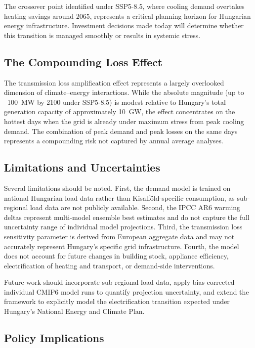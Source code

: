 \documentclass[11pt,a4paper]{article}
\begin{document}
The crossover point identified under SSP5-8.5, where cooling demand
overtakes heating savings around 2065, represents a critical planning
horizon for Hungarian energy infrastructure. Investment decisions made
today will determine whether this transition is managed smoothly or
results in systemic stress.

\subsection{The Compounding Loss Effect}
\label{sec:disc_losses}

The transmission loss amplification effect represents a largely
overlooked dimension of climate--energy interactions. While the
absolute magnitude (up to ~100~MW by 2100 under SSP5-8.5) is modest
relative to Hungary's total generation capacity of approximately 10~GW,
the effect concentrates on the hottest days when the grid is already
under maximum stress from peak cooling demand. The combination of peak
demand and peak losses on the same days represents a compounding risk
not captured by annual average analyses.

\subsection{Limitations and Uncertainties}
\label{sec:disc_limitations}

Several limitations should be noted. First, the demand model is trained
on national Hungarian load data rather than Kisalf\"{o}ld-specific
consumption, as sub-regional load data are not publicly available.
Second, the IPCC AR6 warming deltas represent multi-model ensemble best
estimates and do not capture the full uncertainty range of individual
model projections. Third, the transmission loss sensitivity parameter
is derived from European aggregate data and may not accurately represent
Hungary's specific grid infrastructure. Fourth, the model does not
account for future changes in building stock, appliance efficiency,
electrification of heating and transport, or demand-side interventions.

Future work should incorporate sub-regional load data, apply
bias-corrected individual CMIP6 model runs to quantify projection
uncertainty, and extend the framework to explicitly model the
electrification transition expected under Hungary's National Energy
and Climate Plan.

\subsection{Policy Implications}
\label{sec:disc_policy}
\end{document}
